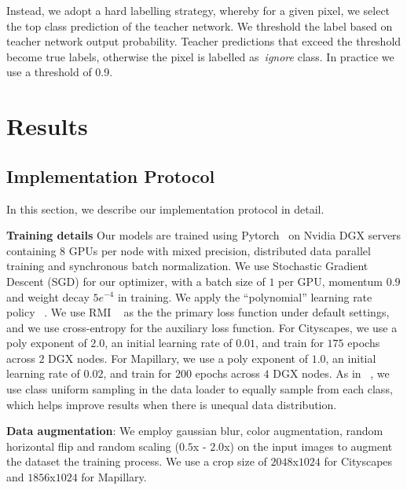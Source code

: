 \documentclass{article}
\begin{document}
Instead, we adopt a hard labelling strategy, whereby for a given pixel, we select the top class prediction of the teacher network. We threshold the label based on teacher network output probability. Teacher predictions that exceed the threshold become true labels, otherwise the pixel is labelled as~\textit{ignore} class. In practice we use a threshold of 0.9.


\section{Results}

\subsection{Implementation Protocol}
In this section, we describe our implementation protocol in detail.

\textbf{Training details} Our models are trained using Pytorch~\cite{NEURIPS2019_9015} on Nvidia DGX servers containing 8 GPUs per node with mixed precision, distributed data parallel training and synchronous batch normalization. We use Stochastic Gradient Descent (SGD) for our optimizer, with a batch size of $1$ per GPU, momentum $0.9$ and weight decay ${5e^{-4}}$ in training. We apply the “polynomial” learning rate policy ~\cite{liu2015parsenet}. We use RMI ~\cite{zhao2019rmi} as the the primary loss function under default settings, and we use cross-entropy for the auxiliary loss function. For Cityscapes, we use a poly exponent of $2.0$, an initial learning rate of $0.01$, and train for $175$ epochs across $2$ DGX nodes. For Mapillary, we use a poly exponent of $1.0$, an initial learning rate of $0.02$, and train for $200$ epochs across $4$ DGX nodes. As in ~\cite{semantic_cvpr19}, we use class uniform sampling in the data loader to equally sample from each class, which helps improve results when there is unequal data distribution.

\textbf{Data augmentation}: We employ gaussian blur, color augmentation, random horizontal flip and random scaling ($0.5$x - $2.0$x) on the input images to augment the dataset the training process. We use a crop size of $2048$x$1024$ for Cityscapes and $1856$x$1024$ for Mapillary.
\end{document}

